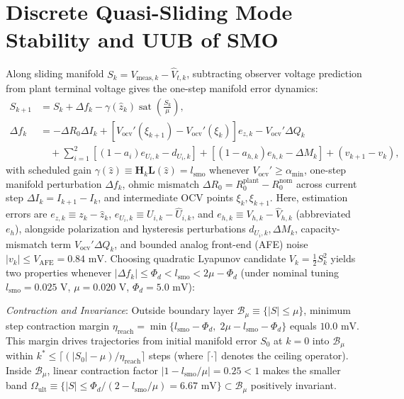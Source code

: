 \documentclass[10pt,a4paper]{article}
\begin{document}
\section{Discrete Quasi-Sliding Mode Stability and UUB of SMO\label{app:lyapunov}}
Along sliding manifold $S_k = V_{\text{meas},k} - \hat{V}_{t,k}$, subtracting observer voltage prediction from plant terminal voltage gives the one-step manifold error dynamics:
\begin{align*}
S_{k+1} &= S_k + \Delta f_k - \gamma(\hat{z}_k)\operatorname{sat}\!\left(\frac{S_k}{\mu}\right), \\
\Delta f_k &= -\Delta R_0 \Delta I_k + \left[V_{\text{ocv}}'(\xi_{k+1}) - V_{\text{ocv}}'(\xi_k)\right] e_{z,k} - V_{\text{ocv}}'\Delta Q_k \\
&\quad + \sum_{i=1}^2 \left[(1-a_i)e_{U_i,k} - d_{U_i,k}\right] + \left[(1-a_{h,k})e_{h,k} - \Delta M_k\right] + (v_{k+1} - v_k),
\end{align*}
with scheduled gain $\gamma(\hat{z}) \equiv \mathbf{H}_k\mathbf{L}(\hat{z}) = l_{\text{smo}}$ whenever $V_{\text{ocv}}' \ge \alpha_{\min}$, one-step manifold perturbation $\Delta f_k$, ohmic mismatch $\Delta R_0 = R_0^{\text{plant}} - R_0^{\text{nom}}$ across current step $\Delta I_k = I_{k+1} - I_k$, and intermediate OCV points $\xi_k, \xi_{k+1}$. Here, estimation errors are $e_{z,k} \equiv z_k - \hat{z}_k$, $e_{U_i,k} \equiv U_{i,k} - \hat{U}_{i,k}$, and $e_{h,k} \equiv V_{h,k} - \hat{V}_{h,k}$ (abbreviated $e_h$), alongside polarization and hysteresis perturbations $d_{U_i,k}, \Delta M_k$, capacity-mismatch term $V_{\text{ocv}}'\Delta Q_k$, and bounded analog front-end (AFE) noise $|v_k| \le V_{\text{AFE}} = 0.84\text{ mV}$. Choosing quadratic Lyapunov candidate $V_k = \tfrac{1}{2}S_k^2$ yields two properties whenever $|\Delta f_k| \le \Phi_d < l_{\text{smo}} < 2\mu - \Phi_d$ (under nominal tuning $l_{\text{smo}} = 0.025\text{ V}$, $\mu = 0.020\text{ V}$, $\Phi_d = 5.0\text{ mV}$):

\emph{Contraction and Invariance}: Outside boundary layer $\mathcal{B}_\mu \equiv \{|S| \le \mu\}$, minimum step contraction margin $\eta_{\text{reach}} = \min\{l_{\text{smo}} - \Phi_d,\; 2\mu - l_{\text{smo}} - \Phi_d\}$ equals $10.0\text{ mV}$. This margin drives trajectories from initial manifold error $S_0$ at $k=0$ into $\mathcal{B}_\mu$ within $k^* \le \lceil (|S_0| - \mu)/\eta_{\text{reach}} \rceil$ steps (where $\lceil \cdot \rceil$ denotes the ceiling operator). Inside $\mathcal{B}_\mu$, linear contraction factor $|1 - l_{\text{smo}}/\mu| = 0.25 < 1$ makes the smaller band $\Omega_{\text{ult}} \equiv \{|S| \le \Phi_d/(2 - l_{\text{smo}}/\mu) = 6.67\text{ mV}\} \subset \mathcal{B}_\mu$ positively invariant.
\end{document}

